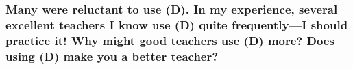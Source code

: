 \documentclass[12pt]{beamer}
\newcommand\gap{\vspace{5mm}}
\begin{document}
\begin{frame}









\end{frame}







\begin{frame}


\gap

\frametitle{ Many were reluctant to use (D). In my experience, several excellent teachers I know use (D) quite frequently---I should practice it! Why might good teachers use (D) more? Does using (D) make you a better teacher?}


\end{frame}
\end{document}
